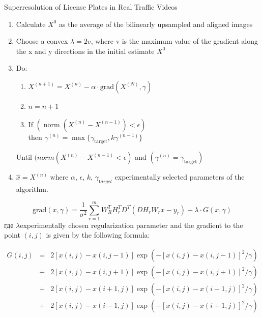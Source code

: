 \begin{frame}[allowframebreaks]{Superresolution of License Plates in Real Traffic Videos}
\begin{enumerate}
  \item Calculate $X^0$ as the average of the bilinearly upsampled and aligned images
  \item Choose a convex $\lambda = 2v$, where v is the maximum value of the gradient along the x and y directions in the
    initial estimate $X^0$
  \item Do:
    \begin{enumerate}
      \item $X^{(n+1)} = X^{(n)} - \alpha\cdot\mathrm{grad}(X^{(N)}, \gamma) $
      \item $n=n+1$
      \item If $(\operatorname{norm}(X^{(n)}-X^{(n-1)}) < \epsilon)$\\
        then $\gamma^{(n)} = \max \{\gamma_{\mathrm{target}}, k\gamma^{(n-1)}\}$
    \end{enumerate}
    Until $(norm(X^{(n)}-X^{(n-1)} < \epsilon)$ and $(\gamma^{(n)} = \gamma_{\mathrm{target}})$

  \item $ \hat{x} = X^{(n)}$
    where $\alpha$, $\epsilon$, $k$, $\gamma_{\mathrm target}$ experimentally selected parameters of the algorithm.
\end{enumerate}
$$
\mathrm{grad}(x, \gamma) = \frac{1}{\sigma^2} \sum^m_{r=1} W^T_R H^T_r D^T (D H_r W_r x-y_r) + \lambda \cdot G(x, \gamma)
$$
где $\lambda$experimentally chosen regularization parameter and the gradient to the point $ (i, j) $ is given by the
following formula:

$$
\begin{array}{rcl}
 G(i,j) & = & 2\left[x(i,j)-x(i,j-1)\right] \exp\left(-[ x(i,j)-x(i,j-1) ]^2/\gamma \right) \\
& + & 2\left[x(i,j)-x(i,j+1)\right] \exp\left(-[ x(i,j)-x(i,j+1) ]^2/\gamma \right) \\
& + & 2\left[x(i,j)-x(i+1,j)\right] \exp\left(-[ x(i,j)-x(i-1,j) ]^2/\gamma \right) \\
& + & 2\left[x(i,j)-x(i-1,j)\right] \exp\left(-[ x(i,j)-x(i+1,j) ]^2/\gamma \right)
\end{array}
$$
\end{frame}


